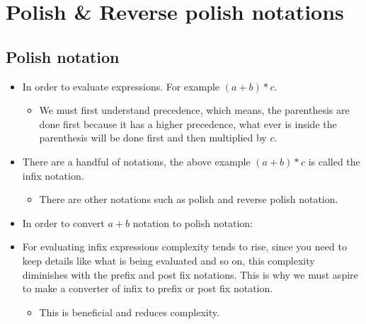 \section{Polish \& Reverse polish notations}
\subsection{Polish notation}
\begin{itemize}
    \item In order to evaluate expressions. For example $(a+b)*c$. 
        \begin{itemize}
            \item We must first understand precedence, which means, the parenthesis are done first because it has a higher precedence, what ever is inside the parenthesis will be done first and then multiplied by $c$.
        \end{itemize}
    
    \item There are a handful of notations, the above example $(a+b)*c$ is called the infix notation. 
        \begin{itemize}
            \item There are other notations such as polish and reverse polish notation. 
        \end{itemize}
    \item In order to convert $a+b$  notation to polish notation:
        \begin{center}
            \begin{figure}[H]
            \end{figure}
        \end{center}
    
    \item For evaluating infix expressions complexity tends to rise, since you need to keep details like what is being evaluated and so on, this complexity diminishes with the prefix and post fix notations. This is why we must aspire to make a converter of infix to prefix or post fix notation. 
        \begin{itemize}
            \item This is beneficial and reduces complexity. 
        \end{itemize}
    

\end{itemize}
